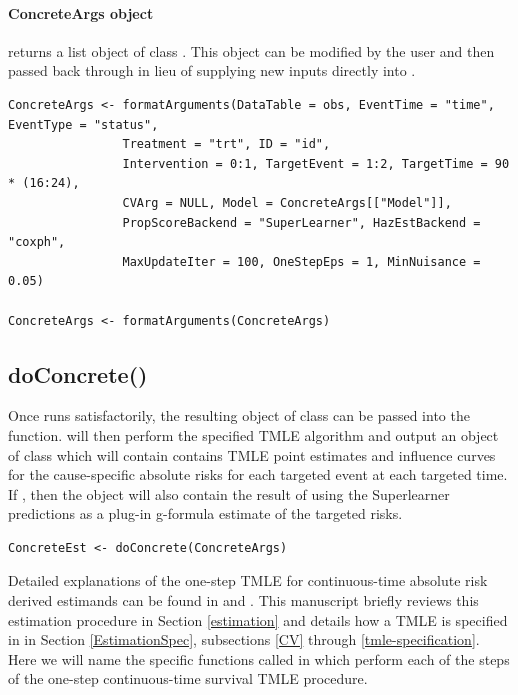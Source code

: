 \documentclass{report}
\newcommand{\1}{\ensuremath{\mathbf{1}}}
\begin{document}
\paragraph{ConcreteArgs object}
\label{concreteargs}
 returns a list object of class . This object can be modified by the user and then passed back through  in lieu of supplying new inputs directly into .

\begin{lstlisting}
ConcreteArgs <- formatArguments(DataTable = obs, EventTime = "time", EventType = "status", 
				Treatment = "trt", ID = "id", 
				Intervention = 0:1, TargetEvent = 1:2, TargetTime = 90 * (16:24), 
				CVArg = NULL, Model = ConcreteArgs[["Model"]], 
				PropScoreBackend = "SuperLearner", HazEstBackend = "coxph", 
				MaxUpdateIter = 100, OneStepEps = 1, MinNuisance = 0.05)

ConcreteArgs <- formatArguments(ConcreteArgs)
\end{lstlisting}

\subsection{doConcrete()}
\label{doConcrete}
Once  runs satisfactorily, the resulting object of class  can be passed into the  function.  will then perform the specified TMLE algorithm and output an object of class  which will contain contains TMLE point estimates and influence curves for the cause-specific absolute risks for each targeted event at each targeted time. If , then the  object will also contain the result of using the Superlearner predictions as a plug-in g-formula estimate of the targeted risks. 

\begin{lstlisting}
ConcreteEst <- doConcrete(ConcreteArgs)
\end{lstlisting}

Detailed explanations of the one-step TMLE for continuous-time absolute risk derived estimands can be found in \cite{rytgaard_one-step_2021} and \cite{rytgaard_continuous-time_2021}. This manuscript briefly reviews this estimation procedure in Section \ref{estimation} and details how a TMLE is specified in  in Section \ref{EstimationSpec}, subsections \ref{CV} through \ref{tmle-specification}. Here we will name the specific functions called in  which perform each of the steps of the one-step continuous-time survival TMLE procedure.
\end{document}
